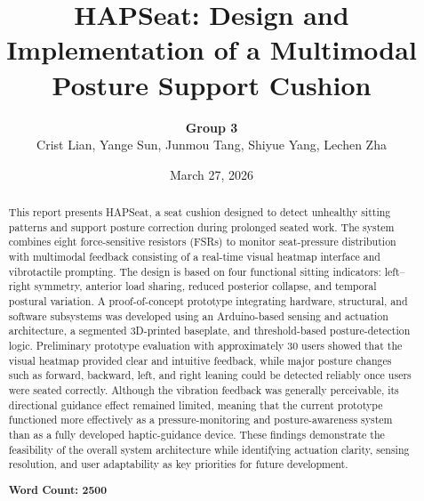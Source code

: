 \documentclass[11pt, a4paper]{article}
\title{\textbf{HAPSeat: Design and Implementation of a Multimodal Posture Support Cushion}}
\author{
\textbf{Group 3} \\
Crist Lian, Yange Sun, Junmou Tang, Shiyue Yang, Lechen Zha
}
\date{March 27, 2026}
\begin{document}
\maketitle
\thispagestyle{empty} %

\vspace*{\fill} 

\begin{abstract}
    \noindent This report presents HAPSeat, a seat cushion designed to detect unhealthy sitting patterns and support posture correction during prolonged seated work. The system combines eight force-sensitive resistors (FSRs) to monitor seat-pressure distribution with multimodal feedback consisting of a real-time visual heatmap interface and vibrotactile prompting. The design is based on four functional sitting indicators: left--right symmetry, anterior load sharing, reduced posterior collapse, and temporal postural variation. A proof-of-concept prototype integrating hardware, structural, and software subsystems was developed using an Arduino-based sensing and actuation architecture, a segmented 3D-printed baseplate, and threshold-based posture-detection logic. Preliminary prototype evaluation with approximately 30 users showed that the visual heatmap provided clear and intuitive feedback, while major posture changes such as forward, backward, left, and right leaning could be detected reliably once users were seated correctly. Although the vibration feedback was generally perceivable, its directional guidance effect remained limited, meaning that the current prototype functioned more effectively as a pressure-monitoring and posture-awareness system than as a fully developed haptic-guidance device. These findings demonstrate the feasibility of the overall system architecture while identifying actuation clarity, sensing resolution, and user adaptability as key priorities for future development.

    
    \vspace{0.5cm}
    \begin{center}
        \textbf{Word Count: 2500}
    \end{center}
\end{abstract}

\vspace*{\fill} 


\newpage
{} %

\end{document}
